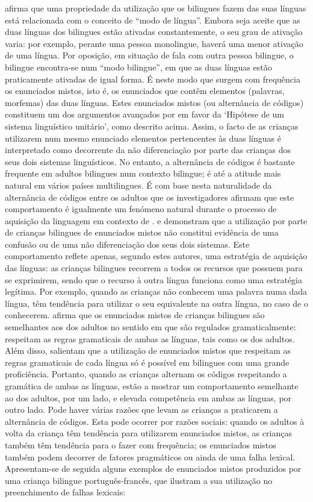 \documentclass[output=paper]{LSP/langsci}
\begin{document}
\cite{grosjean2004} afirma que uma propriedade da utilização que os bilingues fazem das suas línguas está relacionada com o conceito de ``modo de língua''. Embora seja aceite que as duas línguas dos bilingues estão ativadas constantemente, o seu grau de ativação varia: por exemplo, perante uma pessoa monolingue, haverá uma menor ativação de uma língua. Por oposição, em situação de fala com outra pessoa bilingue, o bilingue encontra-se num ``modo bilingue'', em que as duas línguas estão praticamente ativadas de igual forma. É neste modo que surgem com frequência os enunciados mistos, isto é, os enunciados que contêm elementos (palavras, morfemas) das duas línguas. Estes enunciados mistos (ou alternância de códigos) constituem um dos argumentos avançados por \cite{volterrataeschner1978} em favor da `Hipótese de um sistema linguístico unitário', como descrito acima. Assim, o facto de as crianças utilizarem num mesmo enunciado elementos pertencentes às duas línguas é interpretado como decorrente da não diferenciação por parte das crianças dos seus dois sistemas linguísticos. No entanto, a alternância de códigos é bastante frequente em adultos bilingues num contexto bilingue; é até a atitude mais natural em vários países multilingues. É com base nesta naturalidade da alternância de códigos entre os adultos que os investigadores afirmam que este comportamento é igualmente um fenómeno natural durante o processo de aquisição da linguagem em contexto de . \cite{leisel1989} e \cite{genesee1989} demonstram que a utilização por parte de crianças bilingues de enunciados mistos não constitui evidência de uma confusão ou de uma não diferenciação dos seus dois sistemas. Este comportamento reflete apenas, segundo estes autores, uma estratégia de aquisição das línguas: as crianças bilingues recorrem a todos os recursos que possuem para se exprimirem, sendo que o recurso à outra língua funciona como uma estratégia legítima. Por exemplo, quando as crianças não conhecem uma palavra numa dada língua, têm tendência para utilizar o seu equivalente na outra língua, no caso de o conhecerem. \cite{genesee1989} afirma que os enunciados mistos de crianças bilingues são semelhantes aos dos adultos no sentido em que são regulados gramaticalmente: respeitam as regras gramaticais de ambas as línguas, tais como os dos adultos. Além disso, \cite{genesee_etal2004} salientam que a utilização de enunciados mistos que respeitam as regras gramaticais de cada língua só é possível em bilingues com uma grande proficiência. Portanto, quando as crianças alternam os códigos respeitando a gramática de ambas as línguas, estão a mostrar um comportamento semelhante ao dos adultos, por um lado, e elevada competência em ambas as línguas, por outro lado. Pode haver várias razões que levam as crianças a praticarem a alternância de códigos. Esta pode ocorrer por razões sociais: quando os adultos à volta da criança têm tendência para utilizarem enunciados mistos, as crianças também têm tendência para o fazer com frequência; os enunciados mistos também podem decorrer de fatores pragmáticos ou ainda de uma falha lexical. Apresentam-se de seguida alguns exemplos de enunciados mistos produzidos por uma criança bilingue português-francês, que ilustram a sua utilização no preenchimento de falhas lexicais:
\end{document}
